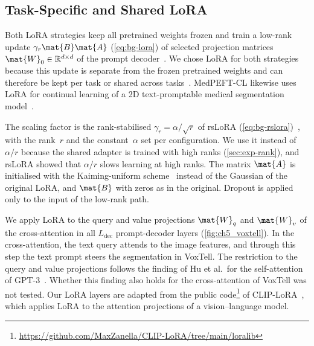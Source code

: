 \subsection{Task-Specific and Shared LoRA}
\label{subsec:method-lora}

Both LoRA strategies keep all pretrained weights frozen and train a low-rank update $\gamma_r\mat{B}\mat{A}$ (\cref{eq:bg-lora}) of selected projection matrices $\mat{W}_0 \in \mathbb{R}^{d \times d}$ of the prompt decoder~\cite{hu2022lora}.
We chose LoRA for both strategies because this update is separate from the frozen pretrained weights and can therefore be kept per task or shared across tasks~\cite[Sec.~4.1]{hu2022lora}.
MedPEFT-CL likewise uses LoRA for continual learning of a 2D text-promptable medical segmentation model~\cite{gao2026medpeftcl}.

The scaling factor is the rank-stabilised $\gamma_r = \alpha / \sqrt{r}$ of rsLoRA (\cref{eq:bg-rslora})~\cite{kalajdzievski2023rankstabilizationscalingfactor}, with the rank~$r$ and the constant~$\alpha$ set per configuration.
We use it instead of $\alpha / r$ because the shared adapter is trained with high ranks (\cref{sec:exp-rank}), and rsLoRA showed that $\alpha / r$ slows learning at high ranks.
The matrix $\mat{A}$ is initialised with the Kaiming-uniform scheme~\cite{he2015delving} instead of the Gaussian of the original LoRA, and $\mat{B}$ with zeros as in the original.
Dropout is applied only to the input of the low-rank path.

We apply LoRA to the query and value projections $\mat{W}_q$ and $\mat{W}_v$ of the cross-attention in all $L_{\mathrm{dec}}$ prompt-decoder layers (\cref{fig:ch5_voxtell}).
In the cross-attention, the text query attends to the image features, and through this step the text prompt steers the segmentation in VoxTell.
The restriction to the query and value projections follows the finding of Hu et al.\ for the self-attention of GPT-3~\cite[Sec.~7.1, Table~5]{hu2022lora}.
Whether this finding also holds for the cross-attention of VoxTell was not tested.
Our LoRA layers are adapted from the public code\footnote{\url{https://github.com/MaxZanella/CLIP-LoRA/tree/main/loralib}} of CLIP-LoRA~\cite{zanella2024lowrankfewshotadaptationvisionlanguage}, which applies LoRA to the attention projections of a vision--language model.

